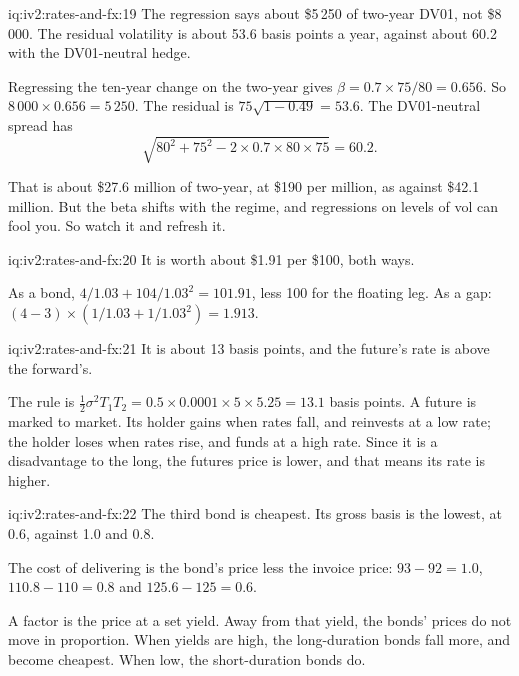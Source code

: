 \begin{solution}{iq:iv2:rates-and-fx:19}
The regression says about \$5\,250 of two-year DV01, not \$8\,000. The residual volatility is about 53.6 basis points a year, against about 60.2 with the DV01-neutral hedge.

Regressing the ten-year change on the two-year gives $\beta = 0.7 \times 75/80 = 0.656$. So $8\,000 \times 0.656 = 5\,250$. The residual is $75\sqrt{1 - 0.49} = 53.6$. The DV01-neutral spread has
\[
\sqrt{80^2 + 75^2 - 2 \times 0.7 \times 80 \times 75} = 60.2.
\]

That is about \$27.6 million of two-year, at \$190 per million, as against \$42.1 million. But the beta shifts with the regime, and regressions on levels of vol can fool you. So watch it and refresh it.

\end{solution}

\begin{solution}{iq:iv2:rates-and-fx:20}
It is worth about \$1.91 per \$100, both ways.

As a bond, $4/1.03 + 104/1.03^2 = 101.91$, less 100 for the floating leg. As a gap: $(4 - 3) \times (1/1.03 + 1/1.03^2) = 1.913$.

\end{solution}

\begin{solution}{iq:iv2:rates-and-fx:21}
It is about 13 basis points, and the future's rate is above the forward's.

The rule is $\tfrac12\sigma^2T_1T_2 = 0.5 \times 0.0001 \times 5 \times 5.25 = 13.1$ basis points. A future is marked to market. Its holder gains when rates fall, and reinvests at a low rate; the holder loses when rates rise, and funds at a high rate. Since it is a disadvantage to the long, the futures price is lower, and that means its rate is higher.

\end{solution}

\begin{solution}{iq:iv2:rates-and-fx:22}
The third bond is cheapest. Its gross basis is the lowest, at 0.6, against 1.0 and 0.8.

The cost of delivering is the bond's price less the invoice price: $93 - 92 = 1.0$, $110.8 - 110 = 0.8$ and $125.6 - 125 = 0.6$.

A factor is the price at a set yield. Away from that yield, the bonds' prices do not move in proportion. When yields are high, the long-duration bonds fall more, and become cheapest. When low, the short-duration bonds do.

\end{solution}

